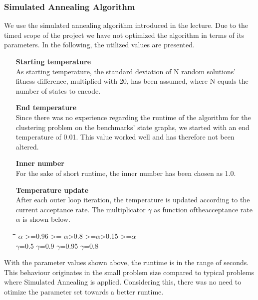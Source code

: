 \subsubsection{Simulated Annealing Algorithm}
\label{subsubsec:SAAlgorithm}

We use the simulated annealing algorithm introduced in the lecture. Due to the timed scope of the project we have not optimized the algorithm in terms of its parameters. In the following, the utilized values are presented.

\begin{itemize}
\item[\textbf{Starting temperature}]\hfill \\
As starting temperature, the standard deviation of N random solutions' fitness difference, multiplied with 20, has been assumed, where N equals the number of states to encode.
\item[\textbf{End temperature}]\hfill \\
Since there was no experience regarding the runtime of the algorithm for the clustering problem on the benchmarks' state graphs, we started with an end temperature of 0.01. This value worked well and has therefore not been altered.
\item[\textbf{Inner number}]\hfill \\
For the sake of short runtime, the inner number has been chosen as 1.0.
\item[\textbf{Temperature update}]\hfill \\
After each outer loop iteration, the temperature is updated according to the current acceptance rate. The multiplicator $\gamma$ as function oftheacceptance rate $\alpha$ is shown below.

\begin{tabbing}
\hspace{4cm}\=\hspace{4cm}\=\hspace{4cm}\=\kill
 $\alpha$ >=0.96  >= $\alpha$>0.8 >=$\alpha$>0.15  >=$\alpha$ \\ 
 $\gamma$=0.5 \>  $\gamma$=0.9 \> $\gamma$=0.95 \> $\gamma$=0.8 
\end{tabbing} 
\end{itemize}


With the parameter values shown above, the runtime is in the range of seconds. This behaviour originates in the small problem size compared to typical problems where Simulated Annealing is applied. Considering this, there was no need to otimize the parameter set towards a better runtime.


